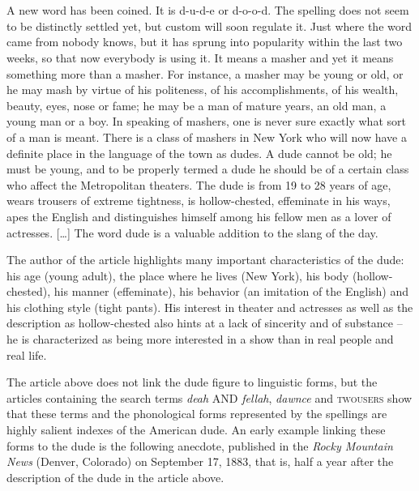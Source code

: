 \begin{ipquote}
\begin{center}
\\
\\
\end{center}
A new word has been coined. It is d-u-d-e or d-o-o-d. The spelling do{\kern0pt}es not seem to be distinctly settled yet, but custom will soon regulate it. Just where the word came from nobody knows, but it has sprung into popularity within the last two weeks, so that now everybody is using it. It means a masher and yet it means something more than a masher. For instance, a masher may be young or old, or he may mash by virtue of his politeness, of his accomplishments, of his wealth, beauty, eyes, nose or fame; he may be a man of mature years, an old man, a young man or a boy. In speaking of mashers, one is never sure exactly what sort of a man is meant. There is a class of mashers in New York who will now have a definite place in the language of the town as dudes. A dude cannot be old; he must be young, and to be properly termed a dude he should be of a certain class who affect the Metropolitan theaters. The dude is from 19 to 28 years of age, wears trousers of extreme tightness, is hollow-chested, effeminate in his ways, apes the English and distinguishes himself among his fellow men as a lover of actresses. […] The word dude is a valuable addition to the slang of the day.
\end{ipquote}

The author of the article highlights many important characteristics of the dude: his age (young adult), the place where he lives (New York), his body (hollow-chested), his manner (effeminate), his behavior (an imitation of the English) and his clothing style (tight pants). His interest in theater and actresses as well as the description as hollow-chested also hints at a lack of sincerity and of substance – he is characterized as being more interested in a show than in real people and real life.

The article above does not link the dude figure to linguistic forms, but the articles containing the search terms \emph{deah} AND \emph{fellah}, \emph{dawnce} and \textsc{twousers} show that these terms and the phonological forms represented by the spellings are highly salient indexes of the American dude. An early example linking these forms to the dude is the following anecdote, published in the \emph{Rocky Mountain News} (Denver, Colorado) on September 17, 1883, that is, half a year after the description of the dude in the article above.

